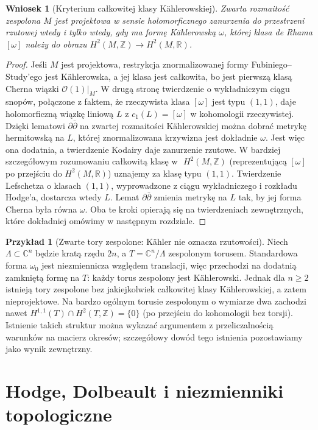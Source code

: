 \documentclass[11pt,a4paper,openany]{report}
\numberwithin{equation}{section}
\theoremstyle{plain}
\newtheorem{wniosek}[twierdzenie]{Wniosek}
\theoremstyle{definition}
\newtheorem{przyklad}[twierdzenie]{Przykład}
\theoremstyle{remark}
\newcommand{\Z}{\mathbb Z}
\newcommand{\R}{\mathbb R}
\newcommand{\C}{\mathbb C}
\begin{document}
\begin{wniosek}[Kryterium całkowitej klasy Kählerowskiej]
\label{wn:ga9-integral-kahler}
Zwarta rozmaitość zespolona $M$ jest projektowa
w sensie holomorficznego zanurzenia do przestrzeni
rzutowej wtedy i tylko wtedy, gdy ma formę Kählerowską
$\omega$, której klasa de Rhama $[\omega]$ należy
do obrazu $H^2(M,\Z)\to H^2(M,\R)$.
\end{wniosek}
\begin{proof}
Jeśli $M$ jest projektowa, restrykcja znormalizowanej
formy Fubiniego--Study'ego jest Kählerowska, a jej
klasa jest całkowita, bo jest pierwszą klasą Cherna
wiązki $\mathcal O(1)|_M$.
W drugą stronę twierdzenie o wykładniczym ciągu snopów,
połączone z faktem, że rzeczywista klasa $[\omega]$
jest typu $(1,1)$, daje holomorficzną wiązkę liniową
$L$ z $c_1(L)=[\omega]$ w kohomologii rzeczywistej.
Dzięki lematowi $\partial\bar\partial$ na zwartej
rozmaitości Kählerowskiej można dobrać metrykę
hermitowską na $L$, której znormalizowana krzywizna
jest dokładnie $\omega$. Jest więc ona dodatnia,
a twierdzenie Kodairy daje zanurzenie rzutowe.
W bardziej szczegółowym rozumowaniu całkowitą klasę w\,~$H^2(M,\Z)$
(reprezentującą $[\omega]$ po przejściu do $H^2(M,\R)$)
uznajemy za klasę typu $(1,1)$. Twierdzenie Lefschetza o klasach
$(1,1)$, wyprowadzone z ciągu wykładniczego i rozkładu Hodge'a,
dostarcza wtedy $L$. Lemat $\partial\bar\partial$ zmienia
metrykę na $L$ tak, by jej forma Cherna była równa $\omega$.
Oba te kroki opierają się na twierdzeniach zewnętrznych,
które dokładniej omówimy w następnym rozdziale.
\end{proof}

\begin{przyklad}[Zwarte tory zespolone: Kähler nie oznacza rzutowości]
Niech $\Lambda\subset\C^n$ będzie kratą rzędu $2n$,
a $T=\C^n/\Lambda$ zespolonym torusem. Standardowa
forma $\omega_0$ jest niezmiennicza względem translacji,
więc przechodzi na dodatnią zamkniętą formę na $T$:
każdy torus zespolony jest Kählerowski.
Jednak dla $n\ge2$ istnieją tory zespolone bez
jakiejkolwiek całkowitej klasy Kählerowskiej,
a zatem nieprojektowe. Na bardzo ogólnym torusie
zespolonym o wymiarze dwa zachodzi nawet
$H^{1,1}(T)\cap H^2(T,\Z)=\{0\}$ (po przejściu do
kohomologii bez torsji). Istnienie takich struktur
można wykazać argumentem z przeliczalnością warunków
na macierz okresów; szczegółowy dowód tego istnienia
pozostawiamy jako wynik zewnętrzny.
\end{przyklad}

\section{Hodge, Dolbeault i niezmienniki topologiczne}
\label{sec:ga9-hodge}
\end{document}
